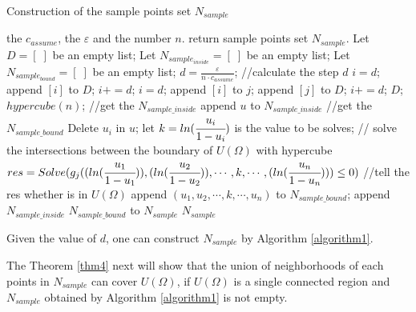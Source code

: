 \begin{breakablealgorithm}\label{algorithm1}
	\caption{Construction of the sample points set $N_{sample}$ }
	\begin{algorithmic}[1] 
		\Require the $c_{assume}$, the $\varepsilon$ and the number $n$.          
		\Ensure return sample points set $N_{sample}$.
		\State Let $D=[\;]$ be an empty list;
		\State Let $N_{sample_{inside}}=[\;]$ be an empty list;
		\State Let $N_{sample_{bound}}=[\;]$ be an empty list;
		\State $d = \frac{\varepsilon }{{n\cdot{c_{assume}}}}$; \quad\quad//calculate the step $d$
		\State $i=d$;
		\State append $[i]$ to $D$;
		\State $i += d$;
		\EndWhile
		\Else{}
		\State $i=d$;
		\State append $[i]$ to $j$;
		\State append $[j]$ to $D$;
		\State$i+=d$;
		\EndWhile
		\EndFor
		\EndIf
		\State\Return $D$;
		\EndFunction
		\State$hypercube(n)$;
		     \quad\quad //get the $N_{sample\_inside}$
		\State append $u$ to $N_{sample\_inside}$
		\EndIf
		\EndFor
		 \quad\quad //get the $N_{sample\_bound}$
		\State Delete $u_{i}$ in $u$; 
		\State let $k=ln(\cfrac{u_{i}}{1-u_{i}})$ is the value to be solves;
		 \quad\quad // solve the intersections between the boundary of $U(\Omega)$ with hypercube
		\State$res=Solve(g_{j}((ln(\cfrac{u_{1}}{1-u_{1}})),(ln(\cfrac{u_{2}}{1-u_{2}})),\cdots,k,\cdots,(ln(\cfrac{u_{n}}{1-u_{n}})))\leq0)$
		 \quad\quad //tell the res whether is in $U(\Omega)$
		\State append $(u_{1},u_{2},\cdots,k,\cdots,u_{n})$ to $N_{sample\_bound}$;
		\EndIf
		\EndFor
		\EndFor
		\EndFor
		\EndFor
		\State append $N_{sample\_inside}$ $N_{sample\_bound}$ to $N_{sample}$
		\State \Return $N_{sample}$
	\end{algorithmic}
\end{breakablealgorithm}
\begin{rem}
	Given the value of $d$, one can construct $N_{sample}$ by Algorithm \ref{algorithm1}.
\end{rem}

The Theorem \ref{thm4} next will show that the union of neighborhoods of each points in $N_{sample}$ can cover $U(\Omega)$, if $U({\Omega})$ is a single connected region and ${N_{sample}}$ obtained by Algorithm \ref{algorithm1} is not empty.

